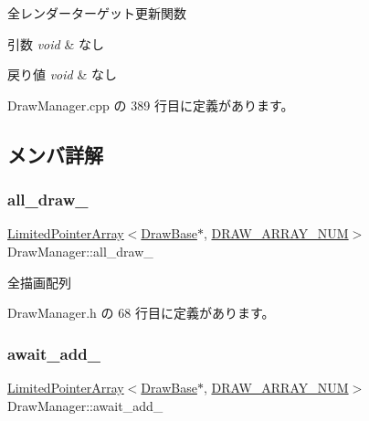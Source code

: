 全レンダーターゲット更新関数 


\begin{DoxyParams}{引数}
{\em void} & なし \\
\hline
\end{DoxyParams}

\begin{DoxyRetVals}{戻り値}
{\em void} & なし \\
\hline
\end{DoxyRetVals}


 Draw\+Manager.\+cpp の 389 行目に定義があります。



\subsection{メンバ詳解}
\mbox{\label{class_draw_manager_a328d73b404a5609d3e89a299362253fd}} 
\subsubsection{\texorpdfstring{all\+\_\+draw\+\_\+}{all\_draw\_}}
{\footnotesize\ttfamily \mbox{\hyperlink{class_limited_pointer_array}{Limited\+Pointer\+Array}}$<$\mbox{\hyperlink{class_draw_base}{Draw\+Base}}$\ast$, \mbox{\hyperlink{class_draw_manager_ad4326cddcb1cc4cec198c4f8069b81f0}{D\+R\+A\+W\+\_\+\+A\+R\+R\+A\+Y\+\_\+\+N\+UM}}$>$ Draw\+Manager\+::all\+\_\+draw\+\_\+\hspace{0.3cm}{\ttfamily [private]}}



全描画配列 



 Draw\+Manager.\+h の 68 行目に定義があります。

\mbox{\label{class_draw_manager_aa6a8468dd4469cde2cf162b91a5c1faf}} 
\subsubsection{\texorpdfstring{await\+\_\+add\+\_\+}{await\_add\_}}
{\footnotesize\ttfamily \mbox{\hyperlink{class_limited_pointer_array}{Limited\+Pointer\+Array}}$<$\mbox{\hyperlink{class_draw_base}{Draw\+Base}}$\ast$, \mbox{\hyperlink{class_draw_manager_ad4326cddcb1cc4cec198c4f8069b81f0}{D\+R\+A\+W\+\_\+\+A\+R\+R\+A\+Y\+\_\+\+N\+UM}}$>$ Draw\+Manager\+::await\+\_\+add\+\_\+\hspace{0.3cm}{\ttfamily [private]}}



